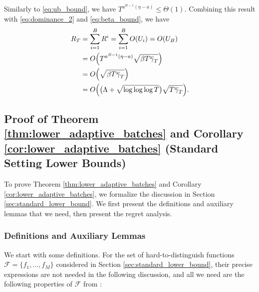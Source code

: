 \documentclass[10pt]{article}
\begin{document}
Similarly to \eqref{eq:ub_bound}, we have $T^{a^{B-1}(\eta-a)} \leq \Theta(1)$. 
Combining this result with \eqref{eq:dominance_2} and \eqref{eq:beta_bound}, we have
\begin{align}
    R_T 
    & = \sum_{i=1}^B R^i
    = \sum_{i=1}^B O(U_i)
    = O(U_B) \\
    & = O\Bigl( T^{a^{B-1}(\eta-a)} \sqrt{\beta T\overline{\gamma}_T} \Bigr) \\
    & = O\Bigl( \sqrt{\beta T\overline{\gamma}_T} \Bigr) \\
    & = O\Bigl(\bigl(\Lambda + \sqrt{\log \log\log T}\bigr) \sqrt{T\overline{\gamma}_T}\Bigr) \label{eq:bound_mat}.
\end{align}

\subsection{Proof of Theorem \ref{thm:lower_adaptive_batches} and Corollary \ref{cor:lower_adaptive_batches} (Standard Setting Lower Bounds)}
\label{app:proof_lower_adaptive_batches}
To prove Theorem \ref{thm:lower_adaptive_batches} and Corollary \ref{cor:lower_adaptive_batches}, we formalize the discussion in Section \ref{sec:standard_lower_bound}. We first present the definitions and auxiliary lemmas that we need, then present the regret analysis.

\subsubsection{Definitions and Auxiliary Lemmas}
We start with some definitions.
For the set of hard-to-distinguish functions $\mathcal{F}=\{f_1, \ldots, f_M\}$ considered in Section \ref{sec:standard_lower_bound}, their precise expressions are not needed in the following discussion, and all we need are the following properties of $\mathcal{F}$ from \citep{Scarlett17}:
\end{document}
